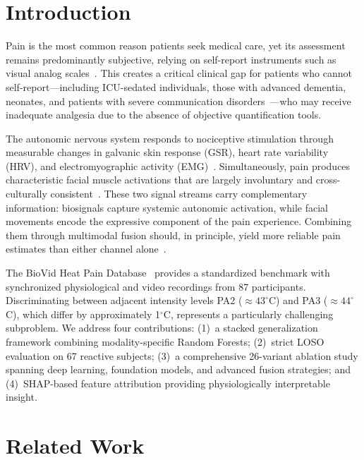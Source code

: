 \documentclass[sigconf]{acmart}
\begin{document}
\section{Introduction}
\label{sec:intro}

Pain is the most common reason patients seek medical care, yet its assessment
remains predominantly subjective, relying on self-report instruments such as
visual analog scales~\cite{jensen2003}. This creates a critical clinical gap
for patients who cannot self-report---including ICU-sedated individuals, those
with advanced dementia, neonates, and patients with severe communication
disorders~\cite{puntillo2004,lichtner2014}---who may receive inadequate
analgesia due to the absence of objective quantification tools.

The autonomic nervous system responds to nociceptive stimulation through
measurable changes in galvanic skin response (GSR), heart rate variability
(HRV), and electromyographic activity (EMG)~\cite{loggia2011}. Simultaneously,
pain produces characteristic facial muscle activations that are largely
involuntary and cross-culturally consistent~\cite{ekman1978,prkachin2008}.
These two signal streams carry complementary information: biosignals capture
systemic autonomic activation, while facial movements encode the expressive
component of the pain experience. Combining them through multimodal fusion
should, in principle, yield more reliable pain estimates than either channel
alone~\cite{werner2017}.

The BioVid Heat Pain Database~\cite{walter2013} provides a standardized
benchmark with synchronized physiological and video recordings from 87
participants. Discriminating between adjacent intensity levels PA2
($\approx 43^\circ$C) and PA3 ($\approx 44^\circ$C), which differ by
approximately 1$^\circ$C, represents a particularly challenging subproblem.
We address four contributions: (1)~a stacked generalization framework combining
modality-specific Random Forests; (2)~strict LOSO evaluation on 67 reactive
subjects; (3)~a comprehensive 26-variant ablation study spanning deep learning,
foundation models, and advanced fusion strategies; and (4)~SHAP-based feature
attribution providing physiologically interpretable insight.

\section{Related Work}
\label{sec:related}
\end{document}
